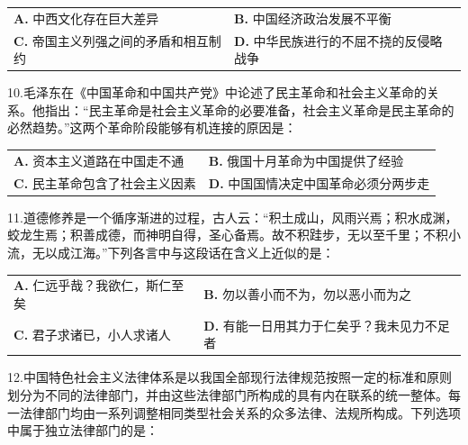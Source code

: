 \documentclass[UTF8,11pt]{ctexart}
\begin{document}
\begin{center}\begin{tabular}{>{\raggedright\arraybackslash}p{\dimexpr(\linewidth-4\tabcolsep)/2\relax}>{\raggedright\arraybackslash}p{\dimexpr(\linewidth-4\tabcolsep)/2\relax}}
\textbf{A.} 中西文化存在巨大差异 & \textbf{B.} 中国经济政治发展不平衡\\[.35em]
\textbf{C.} 帝国主义列强之间的矛盾和相互制约 & \textbf{D.} 中华民族进行的不屈不挠的反侵略战争\\[.35em]\end{tabular}\end{center}

10.毛泽东在《中国革命和中国共产党》中论述了民主革命和社会主义革命的关系。他指出：“民主革命是社会主义革命的必要准备，社会主义革命是民主革命的必然趋势。”这两个革命阶段能够有机连接的原因是：


\begin{center}\begin{tabular}{>{\raggedright\arraybackslash}p{\dimexpr(\linewidth-4\tabcolsep)/2\relax}>{\raggedright\arraybackslash}p{\dimexpr(\linewidth-4\tabcolsep)/2\relax}}
\textbf{A.} 资本主义道路在中国走不通 & \textbf{B.} 俄国十月革命为中国提供了经验\\[.35em]
\textbf{C.} 民主革命包含了社会主义因素 & \textbf{D.} 中国国情决定中国革命必须分两步走\\[.35em]\end{tabular}\end{center}

11.道德修养是一个循序渐进的过程，古人云：“积土成山，风雨兴焉；积水成渊，蛟龙生焉；积善成德，而神明自得，圣心备焉。故不积跬步，无以至千里；不积小流，无以成江海。”下列各言中与这段话在含义上近似的是：


\begin{center}\begin{tabular}{>{\raggedright\arraybackslash}p{\dimexpr(\linewidth-4\tabcolsep)/2\relax}>{\raggedright\arraybackslash}p{\dimexpr(\linewidth-4\tabcolsep)/2\relax}}
\textbf{A.} 仁远乎哉？我欲仁，斯仁至矣 & \textbf{B.} 勿以善小而不为，勿以恶小而为之\\[.35em]
\textbf{C.} 君子求诸已，小人求诸人 & \textbf{D.} 有能一日用其力于仁矣乎？我未见力不足者\\[.35em]\end{tabular}\end{center}

12.中国特色社会主义法律体系是以我国全部现行法律规范按照一定的标准和原则划分为不同的法律部门，并由这些法律部门所构成的具有内在联系的统一整体。每一法律部门均由一系列调整相同类型社会关系的众多法律、法规所构成。下列选项中属于独立法律部门的是：
\end{document}

